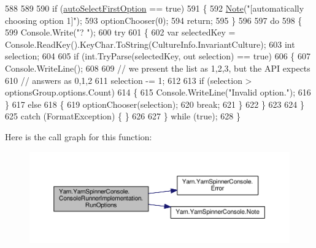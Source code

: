 \begin{DoxyCode}
588 
589 
590                 \textcolor{keywordflow}{if} (\hyperlink{a00053_a09a552ee9ff58cb3c995f8ecba1592b6}{autoSelectFirstOption} == \textcolor{keyword}{true})
591                 \{
592                     \hyperlink{a00172_a939cc9e943c574b36c6af93e9c772702}{Note}(\textcolor{stringliteral}{"[automatically choosing option 1]"});
593                     optionChooser(0);
594                     \textcolor{keywordflow}{return};
595                 \}
596 
597                 \textcolor{keywordflow}{do}
598                 \{
599                     Console.Write(\textcolor{stringliteral}{"? "});
600                     \textcolor{keywordflow}{try}
601                     \{
602                         var selectedKey = Console.ReadKey().KeyChar.ToString(CultureInfo.InvariantCulture);
603                         \textcolor{keywordtype}{int} selection;
604 
605                         \textcolor{keywordflow}{if} (\textcolor{keywordtype}{int}.TryParse(selectedKey, out selection) == \textcolor{keyword}{true})
606                         \{
607                             Console.WriteLine();
608 
609                             \textcolor{comment}{// we present the list as 1,2,3, but the API expects}
610                             \textcolor{comment}{// answers as 0,1,2}
611                             selection -= 1;
612 
613                             \textcolor{keywordflow}{if} (selection > optionsGroup.options.Count)
614                             \{
615                                 Console.WriteLine(\textcolor{stringliteral}{"Invalid option."});
616                             \}
617                             \textcolor{keywordflow}{else}
618                             \{
619                                 optionChooser(selection);
620                                 \textcolor{keywordflow}{break};
621                             \}
622                         \}
623 
624                     \}
625                     \textcolor{keywordflow}{catch} (FormatException) \{ \}
626 
627                 \} \textcolor{keywordflow}{while} (\textcolor{keyword}{true});
628             \}
\end{DoxyCode}


Here is the call graph for this function\-:
\nopagebreak
\begin{figure}[H]
\begin{center}
\leavevmode
\includegraphics[width=350pt]{a00053_a62674694fa65e5ae8c0c0da4fbceda51_cgraph}
\end{center}
\end{figure}


